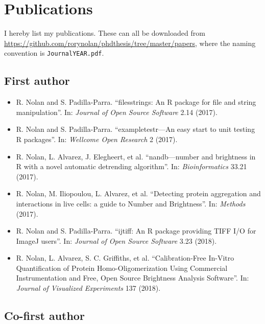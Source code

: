 \documentclass[12pt,]{book}
\providecommand{\tightlist}{%
  \setlength{\itemsep}{0pt}\setlength{\parskip}{0pt}}
\theoremstyle{definition}
\theoremstyle{definition}
\theoremstyle{definition}
\theoremstyle{remark}
\begin{document}
\section*{Publications}\label{publications}

I hereby list my publications. These can all be downloaded from
\url{https://github.com/rorynolan/phdthesis/tree/master/papers}, where
the naming convention is \texttt{JournalYEAR.pdf}.

\subsection*{First author}\label{first-author}

\begin{itemize}
\tightlist
\item
  R. Nolan and S. Padilla-Parra. ``filesstrings: An R package for file
  and string manipulation''. In: \emph{Journal of Open Source Software}
  2.14 (2017).
\item
  R. Nolan and S. Padilla-Parra. ``exampletestr---An easy start to unit
  testing R packages''. In: \emph{Wellcome Open Research} 2 (2017).
\item
  R. Nolan, L. Alvarez, J. Elegheert, et al. ``nandb---number and
  brightness in R with a novel automatic detrending algorithm''. In:
  \emph{Bioinformatics} 33.21 (2017).
\item
  R. Nolan, M. Iliopoulou, L. Alvarez, et al. ``Detecting protein
  aggregation and interactions in live cells: a guide to Number and
  Brightness''. In: \emph{Methods} (2017).
\item
  R. Nolan and S. Padilla-Parra. ``ijtiff: An R package providing TIFF
  I/O for ImageJ users''. In: \emph{Journal of Open Source Software}
  3.23 (2018).
\item
  R. Nolan, L. Alvarez, S. C. Griffiths, et al. ``Calibration-Free
  In-Vitro Quantification of Protein Homo-Oligomerization Using
  Commercial Instrumentation and Free, Open Source Brightness Analysis
  Software''. In: \emph{Journal of Visualized Experiments} 137 (2018).
\end{itemize}

\subsection*{Co-first author}\label{co-first-author}
\end{document}
